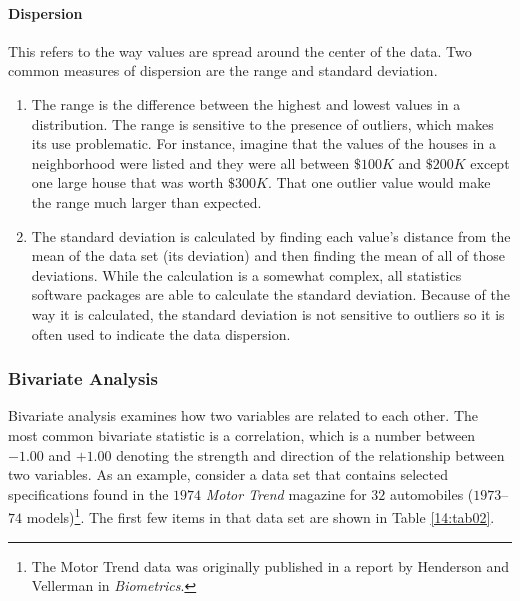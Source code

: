 \paragraph{Dispersion} This refers to the way values are spread around the center of the data. Two common measures of dispersion are the range and standard deviation. 

\begin{enumerate}
	\item The range is the difference between the highest and lowest values in a distribution. The range is sensitive to the presence of outliers, which makes its use problematic. For instance, imagine that the values of the houses in a neighborhood were listed and they were all between $ \$100K $ and $ \$200K $ except one large house that was worth $ \$ 300K $. That one outlier value would make the range much larger than expected.

	\item The standard deviation is calculated by finding each value's distance from the mean of the data set (its deviation) and then finding the mean of all of those deviations. While the calculation is a somewhat complex, all statistics software packages are able to calculate the standard deviation. Because of the way it is calculated, the standard deviation is not sensitive to outliers so it is often used to indicate the data dispersion.

\end{enumerate}

\subsubsection{Bivariate Analysis}

Bivariate analysis examines how two variables are related to each other. The most common bivariate statistic is a correlation, which is a number between $ -1.00 $ and $ +1.00 $ denoting the strength and direction of the relationship between two variables. As an example, consider a data set that contains selected specifications found in the $ 1974 $ \textit{Motor Trend} magazine for $ 32 $ automobiles ($ 1973 $–$ 74 $ models)\footnote{The Motor Trend data was originally published in a report by Henderson and Vellerman in \textit{Biometrics}\cite{henderson1981building}.}. The first few items in that data set are shown in Table \ref{14:tab02}.

